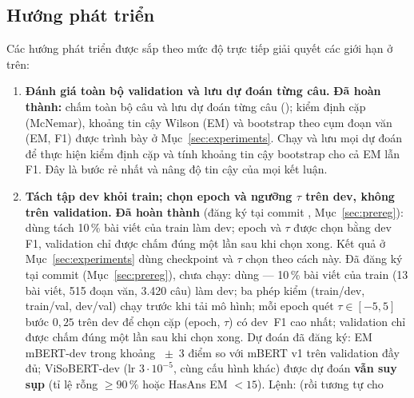 \subsection{Hướng phát triển}
\label{sec:future}

Các hướng phát triển được sắp theo mức độ trực tiếp giải quyết các giới hạn ở trên:

\begin{enumerate}
  \item \textbf{Đánh giá toàn bộ validation và lưu dự đoán từng câu.}
        \ifhasFullEval
        \textbf{Đã hoàn thành:}  chấm toàn bộ \valN{} câu và lưu dự đoán
        từng câu (); kiểm định cặp (McNemar), khoảng tin cậy Wilson
        (EM) và bootstrap theo cụm đoạn văn (EM, F1) được trình bày ở Mục~\ref{sec:experiments}.
        \else
        Chạy  và lưu mọi dự đoán để thực hiện kiểm định cặp và tính
        khoảng tin cậy bootstrap cho cả EM lẫn F1. Đây là bước rẻ nhất và nâng độ tin cậy của mọi
        kết luận.
        \fi
  \item \textbf{Tách tập dev khỏi train; chọn epoch và ngưỡng $\tau$ trên dev, không trên
        validation.}
        \ifhasDev
        \textbf{Đã hoàn thành} (đăng ký tại commit , Mục~\ref{sec:prereg}): dùng
         tách 10\,\% bài viết của train làm dev; epoch
        và $\tau$ được chọn bằng dev F1, validation chỉ được chấm đúng một lần sau khi chọn xong.
        Kết quả ở Mục~\ref{sec:experiments} dùng checkpoint và $\tau$ chọn theo cách này.
        \else
        Đã đăng ký tại commit  (Mục~\ref{sec:prereg}), chưa chạy: dùng
         --- 10\,\% bài
        viết của train (13 bài viết, 515 đoạn văn, 3.420 câu) làm dev; ba phép kiểm
         (train/dev, train/val, dev/val) chạy trước khi tải mô hình; mỗi
        epoch quét $\tau \in [-5, 5]$ bước $0{,}25$ trên dev để chọn cặp (epoch, $\tau$) có dev~F1
        cao nhất; validation chỉ được chấm đúng một lần sau khi chọn xong. Dự đoán đã đăng ký: EM
        mBERT-dev trong khoảng \curveMbertValEMII{}~$\pm$~3 điểm so với mBERT v1 trên validation
        đầy đủ; ViSoBERT-dev (lr $3\cdot10^{-5}$, cùng cấu hình khác) được dự đoán \textbf{vẫn suy
        sụp} (tỉ lệ rỗng $\ge 90\,\%$ hoặc HasAns EM $< 15$). Lệnh:
         (rồi tương tự cho

\end{enumerate}
